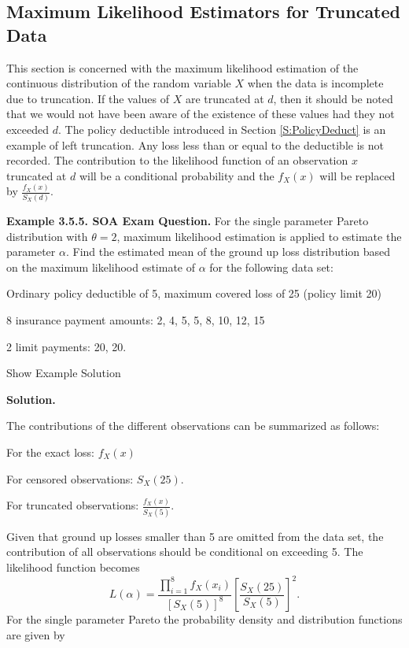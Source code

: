 \documentclass[]{book}
\theoremstyle{definition}
\theoremstyle{definition}
\theoremstyle{definition}
\theoremstyle{remark}
\begin{document}
\subsection{Maximum Likelihood Estimators for Truncated
Data}\label{maximum-likelihood-estimators-for-truncated-data}

This section is concerned with the maximum likelihood estimation of the
continuous distribution of the random variable \(X\) when the data is
incomplete due to truncation. If the values of \(X\) are truncated at
\(d\), then it should be noted that we would not have been aware of the
existence of these values had they not exceeded \(d\). The policy
deductible introduced in Section \ref{S:PolicyDeduct} is an example of
left truncation. Any loss less than or equal to the deductible is not
recorded. The contribution to the likelihood function of an observation
\(x\) truncated at \(d\) will be a conditional probability and the
\(f_{X}\left( x \right)\) will be replaced by
\(\frac{f_{X}\left( x \right)}{S_{X}\left( d \right)}\).

\textbf{Example 3.5.5. SOA Exam Question.} For the single parameter
Pareto distribution with \(\theta = 2\), maximum likelihood estimation
is applied to estimate the parameter \(\alpha\). Find the estimated mean
of the ground up loss distribution based on the maximum likelihood
estimate of \(\alpha\) for the following data set:

Ordinary policy deductible of 5, maximum covered loss of 25 (policy
limit 20)

8 insurance payment amounts: 2, 4, 5, 5, 8, 10, 12, 15

2 limit payments: 20, 20.

Show Example Solution

\hypertarget{toggleExampleLoss.5.5}{}
\textbf{Solution.}

The contributions of the different observations can be summarized as
follows:

For the exact loss: \(f_{X}\left( x \right)\)

For censored observations: \(S_{X}\left( 25 \right)\).

For truncated observations:
\(\frac{f_{X}\left( x \right)}{S_{X}\left( 5 \right)}\).

Given that ground up losses smaller than 5 are omitted from the data
set, the contribution of all observations should be conditional on
exceeding 5. The likelihood function becomes
\[L\left( \alpha \right) = \frac{\prod_{i = 1}^{8}{f_{X}\left( x_{i} \right)}}{\left\lbrack S_{X}\left( 5 \right) \right\rbrack^{8}}\left\lbrack \frac{S_{X}\left( 25 \right)}{S_{X}\left( 5 \right)} \right\rbrack^{2}.\]
For the single parameter Pareto the probability density and distribution
functions are given by
\end{document}
